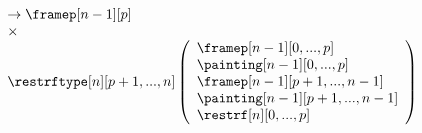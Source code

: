\documentclass{msc}
\begin{document}
\begin{equation*}
\begin{array}{llcl}
\begin{array}{l}
      \rightarrow \framep[n-1][p] \\
      \times                      \\
      \restrftype[n][p+1,...,n]
      \left(\begin{array}{l}
                \framep[n-1][0,...,p]       \\
                \painting[n-1][0,...,p]     \\
                \framep[n-1][p+1,...,n-1]   \\
                \painting[n-1][p+1,...,n-1] \\
                \restrf[n][0,...,p]         \\
              \end{array}\right)
    \end{array}
  \end{array}
\end{equation*}
\end{document}

